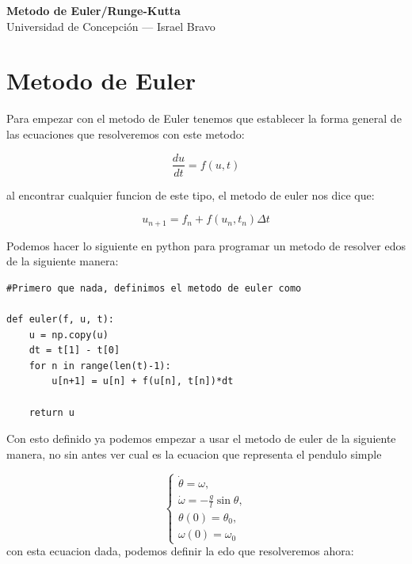 \documentclass[11pt,a4paper]{article}
\begin{document}
\begin{center}
    {\LARGE \textbf{Metodo de Euler/Runge-Kutta}}\\[4pt]
    {\large Universidad de Concepción — Israel Bravo}\\[10pt]
    \hrulefill
\end{center}

\section{Metodo de Euler}
Para empezar con el metodo de Euler tenemos que establecer la forma general de las ecuaciones que resolveremos con este metodo:

\begin{equation}
	\frac{du}{dt} = f(u,t)
\end{equation}

al encontrar cualquier funcion de este tipo, el metodo de euler nos dice que:

\begin{equation}
	u_{n+1}=f_n+f(u_n,t_n) \Delta t
\end{equation}

Podemos hacer lo siguiente en python para programar un metodo de resolver edos de la siguiente manera:

\begin{lstlisting}[caption={Programar el metodo de Euler}]
#Primero que nada, definimos el metodo de euler como

def euler(f, u, t): 
    u = np.copy(u)
    dt = t[1] - t[0]
    for n in range(len(t)-1): 
        u[n+1] = u[n] + f(u[n], t[n])*dt

    return u
\end{lstlisting}
Con esto definido ya podemos empezar a usar el metodo de euler de la siguiente manera, no sin antes ver cual es la ecuacion que representa el pendulo simple

\begin{equation}
\begin{cases}
\dot{\theta} = \omega, \\
\dot{\omega} = -\frac{g}{l} \sin\theta, \\
\theta(0) = \theta_0, \\
\omega(0) = \omega_0
\end{cases}
\end{equation}
con esta ecuacion dada, podemos definir la edo que resolveremos ahora:
\end{document}
